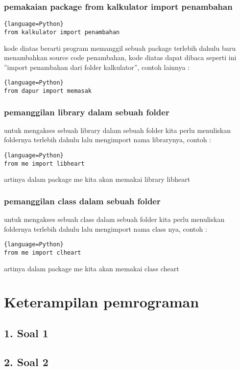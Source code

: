 \subsection{pemakaian package from kalkulator import penambahan}
\par 
\begin{lstlisting}{language=Python}
from kalkulator import penambahan
\end{lstlisting}
kode diatas berarti program memanggil sebuah package terlebih dahulu baru menambahkan source code penambahan, kode diatas dapat dibaca seperti ini ”import penambahan dari folder kalkulator”, contoh lainnya :
\begin{lstlisting}{language=Python}
from dapur import memasak
\end{lstlisting}
\subsection{pemanggilan library dalam sebuah folder}
\par 
untuk mengakses sebuah library dalam sebuah folder kita perlu menuliskan foldernya terlebih dahulu lalu mengimport nama librarynya, contoh :
\begin{lstlisting}{language=Python}
from me import libheart
\end{lstlisting}
artinya dalam package me kita akan memakai library libheart

\subsection{pemanggilan class dalam sebuah folder}
\par 
untuk mengakses sebuah class dalam sebuah folder kita perlu menuliskan foldernya terlebih dahulu lalu mengimport nama class nya, contoh :
\begin{lstlisting}{language=Python}
from me import clheart
\end{lstlisting}
artinya dalam package me kita akan memakai class cheart

\chapter{Keterampilan pemrograman}
\section*{1. Soal 1}

\section*{2. Soal 2}

